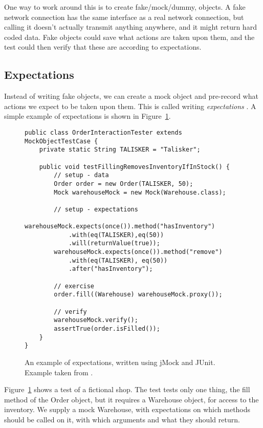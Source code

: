 \documentclass[a4paper,11pt]{kth-mag}
\begin{document}
One way to work around this is to create fake/mock/dummy, objects. A fake
network connection has the same interface as a real network connection, but
calling it doesn't actually transmit anything anywhere, and it might return
hard coded data. Fake objects could save what actions are taken upon them, and
the test could then verify that these are according to expectations.

\subsection{Expectations}

Instead of writing fake objects, we can create a mock object and pre-record
what actions we expect to be taken upon them. This is called writing
\textit{expectations} \cite{fowler07expectations}. A simple example of
expectations is shown in Figure~\ref{figure-expectations}.

\begin{figure}[h!]

\lstset{language=Java}
\begin{lstlisting}
public class OrderInteractionTester extends MockObjectTestCase {
	private static String TALISKER = "Talisker";

	public void testFillingRemovesInventoryIfInStock() {
		// setup - data
		Order order = new Order(TALISKER, 50);
		Mock warehouseMock = new Mock(Warehouse.class);

		// setup - expectations
		warehouseMock.expects(once()).method("hasInventory")
			.with(eq(TALISKER),eq(50))
			.will(returnValue(true));
		warehouseMock.expects(once()).method("remove")
			.with(eq(TALISKER), eq(50))
			.after("hasInventory");

		// exercise
		order.fill((Warehouse) warehouseMock.proxy());

		// verify
		warehouseMock.verify();
		assertTrue(order.isFilled());
	}
}
\end{lstlisting}

\caption{An example of expectations, written using jMock and JUnit.
Example taken from \cite{fowler07expectations}.}
\label{figure-expectations}
\end{figure}

Figure~\ref{figure-expectations} shows a test of a fictional shop. The test
tests only one thing, the fill method of the Order object, but it requires a
Warehouse object, for access to the inventory. We supply a mock Warehouse, with
expectations on which methods should be called on it, with which arguments and
what they should return.
\end{document}

